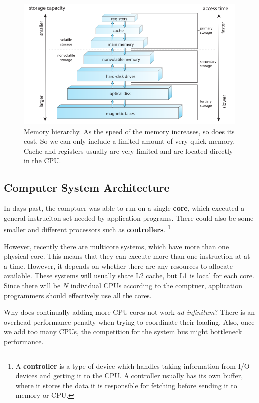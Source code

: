 \documentclass{tufte-handout}
\begin{document}
\begin{center}
	\begin{figure}
		\includegraphics[scale=0.3]{mem_hierarchy}
		\caption{Memory hierarchy. As the speed of the memory increases, so does its
			cost. So we can only include a limited amount of very quick memory. Cache
			and registers usually are very limited and are located directly in the CPU.}
	\end{figure}
\end{center}


\subsection{Computer System Architecture}
In days past, the comptuer was able to run on a single \textbf{core}, which 
executed a general instruciton set needed by application programs. 
There could also be some smaller and different processors such as 
\textbf{controllers}.
\footnote{A \textbf{controller} is a type of device which handles taking information
from I/O devices and getting it to the CPU. A controller usually has its own buffer,
where it stores the data it is responsible for fetching before sending it to memory or 
CPU.}

However, recently there are multicore systems, which have more than one physical core.
This means that they can execute more than one instruction at at a time. 
However, it depends on whether there are any resources to allocate available.
These systems will usually share L2 cache, but L1 is local for each core. Since there
will be $N$ individual CPUs according to the comptuer, application programmers should
effectively use all the cores.

Why does continually adding more CPU cores not work \textit{ad infinitum}? There is 
an overhead performance penalty when trying to coordinate their loading. Also, once 
we add too many CPUs, the competition for the system bus might bottleneck performance.
\end{document}
